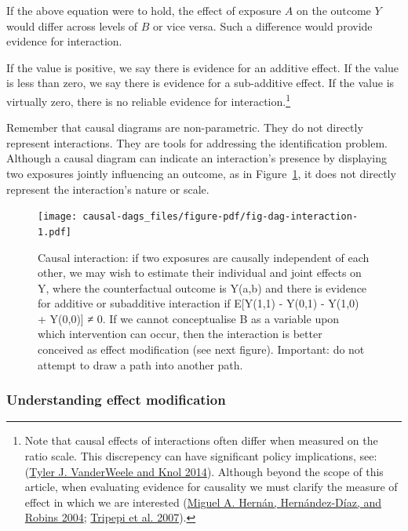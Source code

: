 \documentclass[
  singlecolumn]{report}
\begin{document}
If the above equation were to hold, the effect of exposure \(A\) on the
outcome \(Y\) would differ across levels of \(B\) or vice versa. Such a
difference would provide evidence for interaction.

If the value is positive, we say there is evidence for an additive
effect. If the value is less than zero, we say there is evidence for a
sub-additive effect. If the value is virtually zero, there is no
reliable evidence for interaction.\footnote{Note that causal effects of
  interactions often differ when measured on the ratio scale. This
  discrepency can have significant policy implications, see:
  (\protect\hyperlink{ref-vanderweele2014}{Tyler J. VanderWeele and Knol
  2014}). Although beyond the scope of this article, when evaluating
  evidence for causality we must clarify the measure of effect in which
  we are interested (\protect\hyperlink{ref-hernuxe1n2004}{Miguel A.
  Hernán, Hernández-Díaz, and Robins 2004};
  \protect\hyperlink{ref-tripepi2007}{Tripepi et al. 2007}).}

Remember that causal diagrams are non-parametric. They do not directly
represent interactions. They are tools for addressing the identification
problem. Although a causal diagram can indicate an interaction's
presence by displaying two exposures jointly influencing an outcome, as
in Figure~\ref{fig-dag-interaction}, it does not directly represent the
interaction's nature or scale.

\begin{figure}

{\centering \texttt{[image: causal-dags\_files/figure-pdf/fig-dag-interaction-1.pdf]}

}

\caption{\label{fig-dag-interaction}Causal interaction: if two exposures
are causally independent of each other, we may wish to estimate their
individual and joint effects on Y, where the counterfactual outcome is
Y(a,b) and there is evidence for additive or subadditive interaction if
E{[}Y(1,1) - Y(0,1) - Y(1,0) + Y(0,0){]} ≠ 0. If we cannot conceptualise
B as a variable upon which intervention can occur, then the interaction
is better conceived as effect modification (see next figure). Important:
do not attempt to draw a path into another path.}

\end{figure}

\hypertarget{understanding-effect-modification}{%
\subsubsection{\texorpdfstring{\textbf{Understanding effect
modification}}{Understanding effect modification}}\label{understanding-effect-modification}}
\end{document}
